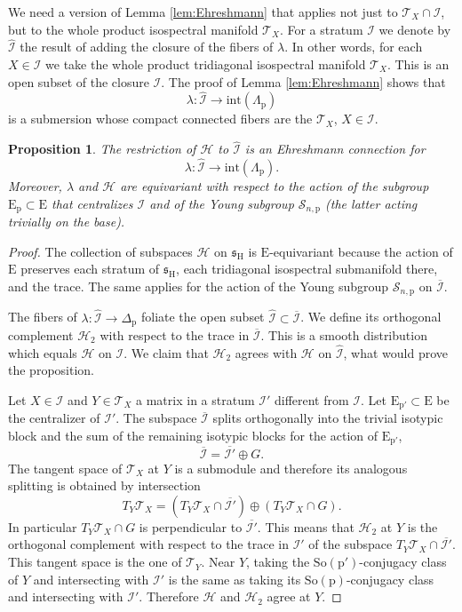 \documentclass[reqno]{amsart}
\newcommand{\p}{\mathrm{p}}
\renewcommand{\ss}{\mathfrak{s}}
\newcommand{\cH}{\mathcal{H}}
\newcommand{\cI}{\mathcal{I}}
\newcommand{\cS}{\mathcal{S}}
\newcommand{\cT}{\mathcal{T}}
\newcommand{\E}{\mathrm{E}}
\newcommand{\So}{\mathrm{So}}
\renewcommand{\H}{\mathrm{H}}
\newtheorem{proposition}[theorem]{Proposition}
\begin{document}
We need a version of Lemma \ref{lem:Ehreshmann} that applies not just to $\cT_X\cap \cI$, but to the whole product isospectral manifold $\cT_X$.
For a stratum $\cI$ we denote by $\widehat{\cI}$ the result of adding the closure of the fibers of $\lambda$. In other words, for each $X\in \cI$ we take the whole product tridiagonal isospectral manifold $\cT_X$. This is an open subset of the closure $\cI$.
The proof of Lemma \ref{lem:Ehreshmann} shows that
\[\lambda:\widehat{\cI}\to \mathrm{int}(\Lambda_{\p})\]
is a submersion whose compact connected fibers are the $\cT_X$, $X\in \cI$.



\begin{proposition}\label{pro:Ehreshmann} The restriction of $\cH$ to $\widehat{\cI}$ is an Ehreshmann connection for
\[\lambda:\widehat{\cI}\to \mathrm{int}(\Lambda_{\p}).\]
Moreover, $\lambda$ and $\cH$ are equivariant with respect to the action of the subgroup  $\E_{\p}\subset \E$ that centralizes $\cI$ and of the Young subgroup $\cS_{n,\p}$ (the latter acting trivially on the base).
\end{proposition}
\begin{proof}
The collection of subspaces $\cH$ on $\ss_\H$ is $\E$-equivariant because  the action of $\E$ preserves each stratum of $\ss_\H$, each tridiagonal isospectral submanifold there, and the trace. %
The same applies for the action of the Young subgroup $\cS_{n,\p}$ on $\overline{\cI}$.

The fibers of $\lambda:\widehat{\cI}\to \Delta_\p$ foliate the open subset $\widehat{\cI}\subset \overline{\cI}$. We define its orthogonal complement $\cH_2$ with respect to the trace in $\overline{\cI}$. This is a smooth distribution which equals $\cH$ on $\cI$. We claim that $\cH_2$ agrees with $\cH$ on $\widehat{\cI}$, what would prove  the proposition.

Let $X\in \cI$ and $Y\in \cT_X$ a matrix in a stratum $\cI'$ different from $\cI$.  Let $\E_{\p'}\subset \E$ be the centralizer of $\cI'$. The subspace $\overline{\cI}$  splits orthogonally into the trivial isotypic block and the sum of the remaining isotypic blocks for the action of $\E_{\p'}$,
\[\overline{\cI}=\overline{\cI'}\oplus G.\]
The tangent space of $\cT_X$ at $Y$ is a submodule and therefore its analogous splitting is obtained by intersection
\[T_Y\cT_X=(T_Y\cT_X\cap \overline{\cI'})\oplus (T_Y\cT_X\cap G).\]
In particular $T_Y\cT_X\cap G$ is perpendicular to $\overline{\cI'}$. This means that
${\cH_2}$ at $Y$ is  the orthogonal complement with respect to the trace in $\cI'$ of the subspace
$T_Y\cT_X\cap \overline{\cI'}$. This tangent space is the one of $\cT_Y$. Near $Y$, taking the $\So(\p')$-conjugacy class of $Y$ and intersecting with $\cI'$ is the same as  taking its $\So(\p)$-conjugacy class and intersecting with $\cI'$. Therefore $\cH$ and $\cH_2$ agree at $Y$.
\end{proof}
\end{document}
